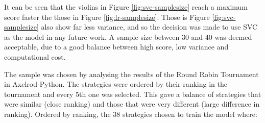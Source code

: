 It can be seen that the violins in Figure \ref{fig:svc-samplesize} reach a maximum score faster the those in Figure \ref{fig:lr-samplesize}.
Those is Figure \ref{fig:svc-samplesize} also show far less variance, and so the decision was made to use SVC as the model in any future work.
A sample size between 30 and 40 was deemed acceptable, due to a good balance between high score, low variance and computational cost.

The sample was chosen by analysing the results of the Round Robin Tournament in Axelrod-Python.
The strategies were ordered by their ranking in the tournament and every 5th one was selected.
This gave a balance of strategies that were similar (close ranking) and those that were very different (large difference in ranking).
Ordered by ranking, the 38 strategies chosen to train the model where:

